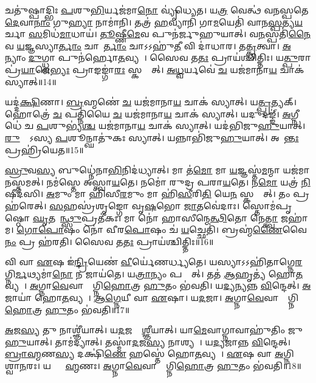 𑌚𑌤𑍁॑𑌷𑍍𑌪𑌾𑌦𑍍𑌭𑌿𑌃 \ul{𑌪}𑌶𑍁\ul{𑌭𑌿}𑌰𑍍𑌯𑌜॑𑌮𑌾\ul{𑌨𑍋} 𑌵𑍍𑌯𑍃॑𑌧𑍍𑌯𑍇𑌤।
𑌯\ul{𑌤𑍍𑌰} 𑌵𑍇𑌤𑍍𑌥॑ 𑌵𑌨𑌸𑍍𑌪𑌤𑍇 \ul{𑌦𑍇}𑌵𑌾\ul{𑌨𑌾𑌂} 𑌗𑍁\ul{𑌹𑍍𑌯𑌾} 𑌨𑌾𑌮𑌾॑𑌨𑌿।
𑌤𑌤𑍍𑌰॑ \ul{𑌹}𑌵𑍍𑌯𑌾𑌨𑌿॑ 𑌗𑌾\ul{𑌮}𑌯𑍇𑌤𑌿॑ 𑌵𑌾𑌨\ul{𑌸𑍍𑌪}𑌤𑍍𑌯\ul{𑌯}𑌰𑍍𑌚𑌾 \ul{𑌸}𑌮𑌿𑌧॑\ul{𑌮𑌾}𑌧𑌾𑌯॑।
\ul{𑌤𑍂}𑌷𑍍𑌣𑍀\ul{𑌮𑍇}𑌵 𑌪𑍁𑌨॑𑌰𑍍𑌜𑍁𑌹𑍁𑌯𑌾𑌤𑍍।
𑌵\ul{𑌨}𑌸𑍍𑌪𑌤𑌿॑\ul{𑌨𑍈}𑌵 \ul{𑌯}𑌜𑍍𑌞𑌸𑍍𑌯𑌾\ul{𑌰𑍍𑌤𑌾𑌂} 𑌚𑌾𑌨𑌾᳚\ul{𑌰𑍍𑌤𑌾𑌂} 𑌚𑌾𑌽𑌽𑌹𑍁॑\ul{𑌤𑍀} 𑌵𑌿 𑌦𑌾॑𑌧𑌾𑌰।
𑌤\ul{𑌤𑍍𑌕𑍃}𑌤𑍍𑌵𑌾।
\ul{𑌅}𑌨𑍍𑌯𑌾𑌂 \ul{𑌦𑍁}𑌗𑍍𑌧𑍍𑌵𑌾 𑌪𑍁𑌨॑𑌰𑍍\mbox{}𑌹𑍋\ul{𑌤}𑌵𑍍𑌯𑌮𑍍᳚।
𑌸𑍈𑌵 𑌤\ul{𑌤𑌃} 𑌪𑍍𑌰𑌾𑌯॑𑌶𑍍𑌚𑌿𑌤𑍍𑌤𑌿𑌃।
𑌯\ul{𑌤𑍍𑌪𑍁}𑌰𑌾 𑌪𑍍𑌰॑\ul{𑌯𑌾}𑌜𑍇\ul{𑌭𑍍𑌯𑌃} 𑌪𑍍𑌰𑌾𑌙𑌙𑍍𑌗𑌾॑\ul{𑌰𑌃} 𑌸𑍍𑌕𑌨𑍍𑌦𑍇᳚𑌤𑍍।
\ul{𑌅}\ul{𑌧𑍍𑌵}𑌰𑍍𑌯𑌵𑍇॑ \ul{𑌚} 𑌯𑌜॑𑌮𑌾𑌨𑌾\ul{𑌯} 𑌚𑌾𑌕॑ 𑌸𑍍𑌯𑌾𑌤𑍍॥14॥

𑌯𑌦𑍍𑌦॑\ul{𑌕𑍍𑌷𑌿}𑌣𑌾।
\ul{𑌬𑍍𑌰}𑌹𑍍𑌮𑌣𑍇॑ \ul{𑌚} 𑌯𑌜॑𑌮𑌾𑌨𑌾\ul{𑌯} 𑌚𑌾𑌕॑ 𑌸𑍍𑌯𑌾𑌤𑍍।
𑌯\ul{𑌤𑍍𑌪𑍍𑌰}𑌤𑍍𑌯𑌕𑍍।
𑌹𑍋𑌤𑍍𑌰𑍇॑ \ul{𑌚} 𑌪𑌤𑍍𑌨𑌿॑𑌯𑍈 \ul{𑌚} 𑌯𑌜॑𑌮𑌾𑌨𑌾\ul{𑌯} 𑌚𑌾𑌕॑ 𑌸𑍍𑌯𑌾𑌤𑍍।
𑌯𑌦𑍁𑌦𑌙𑍍𑌙𑍍॑।
\ul{𑌅}𑌗𑍍𑌨𑍀𑌧𑍇॑ 𑌚 \ul{𑌪}𑌶𑍁𑌭𑍍𑌯॑\ul{𑌶𑍍𑌚} 𑌯𑌜॑𑌮𑌾𑌨𑌾\ul{𑌯} 𑌚𑌾𑌕॑ 𑌸𑍍𑌯𑌾𑌤𑍍।
𑌯𑌦॑𑌭𑌿𑌜𑍁\ul{𑌹𑍁}𑌯𑌾𑌤𑍍।
\ul{𑌰𑍁}𑌦𑍍𑌰𑍋᳚𑌽𑌸𑍍𑌯 \ul{𑌪}𑌶𑍂𑌨𑍍𑌘𑌾𑌤𑍁॑𑌕𑌃 𑌸𑍍𑌯𑌾𑌤𑍍।
𑌯𑌨𑍍𑌨𑌾𑌭𑌿॑𑌜𑍁\ul{𑌹𑍁}𑌯𑌾𑌤𑍍।
𑌅𑌶𑌾᳚\ul{𑌨𑍍𑌤𑌃} 𑌪𑍍𑌰𑌹𑍍𑌰𑌿॑𑌯𑍇𑌤॥15॥

\ul{𑌸𑍍𑌰𑍁}𑌵\ul{𑌸𑍍𑌯} 𑌬𑍁𑌧𑍍𑌨𑍇॑𑌨𑌾\ul{𑌭𑌿}𑌨𑌿𑌦॑𑌧𑍍𑌯𑌾𑌤𑍍।
𑌮𑌾 𑌤॑\ul{𑌮𑍋} 𑌮𑌾 \ul{𑌯}𑌜𑍍𑌞𑌸𑍍𑌤॑\ul{𑌮}𑌨𑍍𑌮𑌾 𑌯𑌜॑𑌮𑌾𑌨𑌸𑍍𑌤𑌮𑌤𑍍।
𑌨𑌮॑𑌸𑍍𑌤𑍇 𑌅𑌸𑍍𑌤𑍍𑌵𑌾\ul{𑌯}𑌤𑍇।
𑌨𑌮𑍋॑ 𑌰𑍁𑌦𑍍𑌰 𑌪𑌰𑌾\ul{𑌯}𑌤𑍇।
𑌨\ul{𑌮𑍋} 𑌯𑌤𑍍𑌰॑ \ul{𑌨𑌿}𑌷𑍀𑌦॑𑌸𑌿।
\ul{𑌅}𑌮𑍁𑌂 𑌮𑌾 𑌹𑌿॑𑌸𑍀\ul{𑌰}𑌮𑍁𑌂 𑌮𑌾 𑌹𑌿॑\ul{𑌸𑍀}𑌰𑌿\ul{𑌤𑌿} 𑌯𑍇\ul{𑌨} 𑌸𑍍𑌕𑌨𑍍𑌦𑍇᳚𑌤𑍍।
𑌤𑌂 𑌪𑍍𑌰𑌹॑𑌰𑍇𑌤𑍍।
\ul{𑌸}𑌹𑌸𑍍𑌰॑𑌶𑍃𑌙𑍍𑌗𑍋 𑌵𑍃\ul{𑌷}𑌭𑍋 \ul{𑌜𑌾}𑌤𑌵𑍇॑𑌦𑌾𑌃।
𑌸𑍍𑌤𑍋𑌮॑𑌪𑍃𑌷𑍍𑌠𑍋 \ul{𑌘𑍃}𑌤𑌵𑌾᳚\ul{𑌨𑍍𑌥𑍍𑌸𑍁}𑌪𑍍𑌰𑌤𑍀॑𑌕𑌃।
𑌮𑌾 𑌨𑍋॑ 𑌹𑌾𑌸𑍀𑌨𑍍𑌮𑍇\ul{𑌤𑍍𑌥𑌿}𑌤𑍋 𑌨𑍇\ul{𑌤𑍍𑌤𑍍𑌵𑌾} 𑌜𑌹𑌾॑𑌮।
\ul{𑌗𑍋}\ul{𑌪𑍋}𑌷𑌂 𑌨𑍋॑ 𑌵𑍀𑌰\ul{𑌪𑍋}𑌷𑌂 𑌚॑ \ul{𑌯}𑌚𑍍𑌛𑍇𑌤𑌿॑।
𑌬𑍍𑌰𑌹𑍍𑌮॑\ul{𑌣𑍈}𑌵𑍈\ul{𑌨𑌂} 𑌪𑍍𑌰 𑌹॑𑌰𑌤𑌿।
𑌸𑍈𑌵 𑌤\ul{𑌤𑌃} 𑌪𑍍𑌰𑌾𑌯॑𑌶𑍍𑌚𑌿𑌤𑍍𑌤𑌿𑌃॥16॥

𑌵𑌿 𑌵𑌾 \ul{𑌏}𑌷 𑌇॑\ul{𑌨𑍍𑌦𑍍𑌰𑌿}𑌯𑍇𑌣॑ \ul{𑌵𑍀}𑌰𑍍𑌯𑍇॑𑌣𑌰𑍍𑌧𑍍𑌯𑌤𑍇।
𑌯𑌸𑍍𑌯𑌾𑌽𑌽𑌹𑌿॑𑌤𑌾𑌗𑍍𑌨𑍇\-\ul{𑌰}𑌗𑍍𑌨𑌿\ul{𑌰𑍍𑌮}𑌥𑍍𑌯\-𑌮𑌾॑\ul{𑌨𑍋} 𑌨 𑌜𑌾𑌯॑𑌤𑍇।
𑌯\ul{𑌤𑍍𑌰𑌾}𑌨𑍍𑌯𑌂 𑌪𑌶𑍍𑌯𑍇᳚𑌤𑍍।
𑌤𑌤॑ \ul{𑌆}𑌹𑍃𑌤𑍍𑌯॑ 𑌹𑍋\ul{𑌤}𑌵𑍍𑌯𑌮𑍍᳚।
\ul{𑌅}𑌗𑍍𑌨𑌾\ul{𑌵𑍇}𑌵𑌾𑌸𑍍𑌯𑌾᳚𑌗𑍍𑌨𑌿\ul{𑌹𑍋}𑌤𑍍𑌰 \ul{𑌹𑍁}𑌤𑌂 𑌭॑𑌵𑌤𑌿।
𑌯\ul{𑌦𑍍𑌯}𑌨𑍍𑌯𑌨𑍍𑌨 \ul{𑌵𑌿}𑌨𑍍𑌦𑍇𑌤𑍍।
\ul{𑌅}𑌜𑌾𑌯𑌾॑ 𑌹𑍋\ul{𑌤}𑌵𑍍𑌯𑌮𑍍᳚।
\ul{𑌆}\ul{𑌗𑍍𑌨𑍇}𑌯𑍀 𑌵𑌾 \ul{𑌏}𑌷𑌾।
𑌯\ul{𑌦}𑌜𑌾।
\ul{𑌅}𑌗𑍍𑌨𑌾\ul{𑌵𑍇}𑌵𑌾𑌸𑍍𑌯𑌾᳚𑌗𑍍𑌨𑌿\ul{𑌹𑍋}𑌤𑍍𑌰 \ul{𑌹𑍁}𑌤𑌂 𑌭॑𑌵𑌤𑌿॥17॥

\ul{𑌅}𑌜\ul{𑌸𑍍𑌯} 𑌤𑍁 𑌨𑌾𑌶𑍍𑌞𑍀॑𑌯𑌾𑌤𑍍।
𑌯\ul{𑌦}𑌜𑌸𑍍𑌯𑌾᳚\ul{𑌶𑍍𑌞𑍀}𑌯𑌾𑌤𑍍।
𑌯𑌾\ul{𑌮𑍇}𑌵𑌾𑌗𑍍𑌨𑌾𑌵𑌾𑌹𑍁॑𑌤𑌿𑌂 𑌜𑍁\ul{𑌹𑍁}𑌯𑌾𑌤𑍍।
𑌤𑌾𑌮॑𑌦𑍍𑌯𑌾𑌤𑍍।
𑌤𑌸𑍍𑌮𑌾॑\ul{𑌦}𑌜\ul{𑌸𑍍𑌯} 𑌨𑌾𑌶𑍍𑌯𑌮𑍍᳚।
𑌯\ul{𑌦𑍍𑌯}𑌜𑌾𑌨𑍍𑌨 \ul{𑌵𑌿}𑌨𑍍𑌦𑍇𑌤𑍍।
\ul{𑌬𑍍𑌰𑌾}\ul{𑌹𑍍𑌮}𑌣\ul{𑌸𑍍𑌯} 𑌦𑌕𑍍𑌷𑌿॑\ul{𑌣𑍇} 𑌹𑌸𑍍𑌤𑍇॑ 𑌹𑍋\ul{𑌤}𑌵𑍍𑌯𑌮𑍍᳚।
\ul{𑌏}𑌷 𑌵𑌾 \ul{𑌅}𑌗𑍍𑌨𑌿𑌰𑍍𑌵𑍈᳚𑌶𑍍𑌵𑌾\ul{𑌨}𑌰𑌃।
𑌯𑌦𑍍𑌬𑍍𑌰𑌾᳚\ul{𑌹𑍍𑌮}𑌣𑌃।
\ul{𑌅}𑌗𑍍𑌨𑌾\ul{𑌵𑍇}𑌵𑌾𑌸𑍍𑌯𑌾᳚𑌗𑍍𑌨𑌿\ul{𑌹𑍋}𑌤𑍍𑌰 \ul{𑌹𑍁}𑌤𑌂 𑌭॑𑌵𑌤𑌿॥18॥

